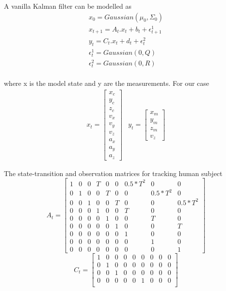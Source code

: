 	A vanilla Kalman filter can be modelled as
	\begin{equation}
	\begin{aligned}
	x_0 = Gaussian(\mu_0,\Sigma_0) \\
	x_{t+1} = A_t.x_t + b_t + \epsilon^{1}_{t+1} \\
	y_{t} = C_t.x_t + d_t + \epsilon^{2}_{t} \\
	\epsilon^{1}_{t} = Gaussian(0,Q) \\
	\epsilon^{2}_{t} = Gaussian(0,R) \\
	\end{aligned}
	\end{equation}

	where x is the model state and y are the measurements.
	For our case
	\begin{equation}
	\begin{aligned}
	x_t
	=\begin{bmatrix}
	x_c \\ y_c \\ z_c \\ v_x \\ v_y \\ v_z \\a_x \\a_y \\a_z
	\end{bmatrix}
	&
	y_t
	=\begin{bmatrix}
	x_m \\ y_m \\ z_m \\ v_z
	\end{bmatrix}
	\end{aligned}
	\end{equation}
			
	The state-transition and observation matrices for tracking human subject
	\begin{equation}
	A_t=
	\begin{bmatrix}
		1 & 0 & 0 & T & 0 & 0 & 0.5*T^2 & 0 & 0\\
		0 & 1 & 0 & 0 & T & 0 & 0 & 0.5*T^2 & 0\\
		0 & 0 & 1 & 0 & 0 & T & 0 & 0 & 0.5*T^2\\
		0 & 0 & 0 & 1 & 0 & 0 & T & 0 & 0\\
		0 & 0 & 0 & 0 & 1 & 0 & 0 & T & 0\\
		0 & 0 & 0 & 0 & 0 & 1 & 0 & 0 & T\\
		0 & 0 & 0 & 0 & 0 & 0 & 1 & 0 & 0\\
		0 & 0 & 0 & 0 & 0 & 0 & 0 & 1 & 0\\
		0 & 0 & 0 & 0 & 0 & 0 & 0 & 0 & 1
	\end{bmatrix}
	\end{equation}
	\begin{equation}
	C_t =
	\begin{bmatrix}
		1 & 0 & 0 & 0 & 0 & 0 & 0 & 0 & 0\\
		0 & 1 & 0 & 0 & 0 & 0 & 0 & 0 & 0\\
		0 & 0 & 1 & 0 & 0 & 0 & 0 & 0 & 0\\
		0 & 0 & 0 & 0 & 0 & 1 & 0 & 0 & 0\\
	\end{bmatrix}
	\end{equation}
	
